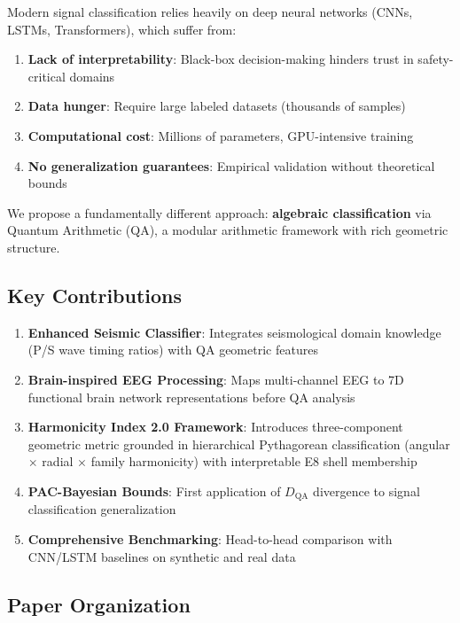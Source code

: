 \documentclass[11pt]{article}
\theoremstyle{remark}
\begin{document}
Modern signal classification relies heavily on deep neural networks (CNNs, LSTMs, Transformers), which suffer from:

\begin{enumerate}
\item \textbf{Lack of interpretability}: Black-box decision-making hinders trust in safety-critical domains
\item \textbf{Data hunger}: Require large labeled datasets (thousands of samples)
\item \textbf{Computational cost}: Millions of parameters, GPU-intensive training
\item \textbf{No generalization guarantees}: Empirical validation without theoretical bounds
\end{enumerate}

We propose a fundamentally different approach: \textbf{algebraic classification} via Quantum Arithmetic (QA), a modular arithmetic framework with rich geometric structure.

\subsection{Key Contributions}

\begin{enumerate}
\item \textbf{Enhanced Seismic Classifier}: Integrates seismological domain knowledge (P/S wave timing ratios) with QA geometric features
\item \textbf{Brain-inspired EEG Processing}: Maps multi-channel EEG to 7D functional brain network representations before QA analysis
\item \textbf{Harmonicity Index 2.0 Framework}: Introduces three-component geometric metric grounded in hierarchical Pythagorean classification (angular $\times$ radial $\times$ family harmonicity) with interpretable E8 shell membership
\item \textbf{PAC-Bayesian Bounds}: First application of $D_{\text{QA}}$ divergence to signal classification generalization
\item \textbf{Comprehensive Benchmarking}: Head-to-head comparison with CNN/LSTM baselines on synthetic and real data
\end{enumerate}

\subsection{Paper Organization}
\end{document}

